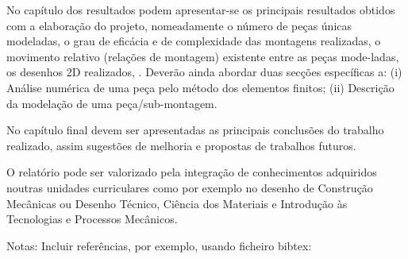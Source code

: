 No capítulo dos resultados podem apresentar-se os principais resultados obtidos
com a elaboração do projeto, nomeadamente o número de peças únicas modeladas, o
grau de eficácia e de complexidade das montagens realizadas, o movimento
relativo (relações de montagem) existente entre as peças mode-ladas, os desenhos
2D realizados, \etc. Deverão ainda abordar duas secções específicas a: (i)
Análise numérica de uma
peça pelo método dos elementos finitos; (ii) Descrição da modelação de uma peça/sub-montagem.

No capítulo final devem ser apresentadas as principais conclusões do trabalho
realizado, assim sugestões de melhoria e propostas de trabalhos futuros.

O relatório pode ser valorizado pela integração de conhecimentos adquiridos
noutras unidades curriculares como por exemplo no desenho de Construção
Mecânicas ou Desenho Técnico, Ciência dos Materiais e
Introdução às Tecnologias e Processos Mecânicos.

Notas: Incluir referências, por exemplo, usando ficheiro bibtex:
\citep{Zeid2014,Biomimic}

